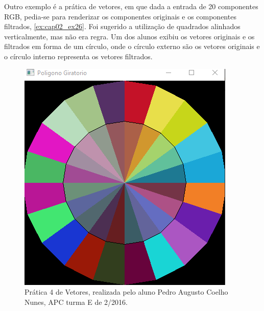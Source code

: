  Outro exemplo é a prática de vetores, em que dada a entrada de 20 componentes RGB, pedia-se para renderizar os componentes originais e os componentes filtrados, \ref{ex:cap02_ex26}. Foi sugerido a utilização de quadrados alinhados verticalmente, mas não era regra. Um dos alunos exibiu os vetores originais e os filtrados em forma de um círculo, onde o círculo externo são os vetores originais e o círculo interno representa os vetores filtrados.

  \begin{figure}[H]
 \begin{center}
 \includegraphics[scale=.7]{img/aluno_lab3.png}
 \end{center}
 \caption{Prática 4 de Vetores, realizada pelo aluno Pedro Augusto Coelho Nunes, \acrshort{APC} turma E de 2/2016.}
 \label{fig:lab3}
 \end{figure}


